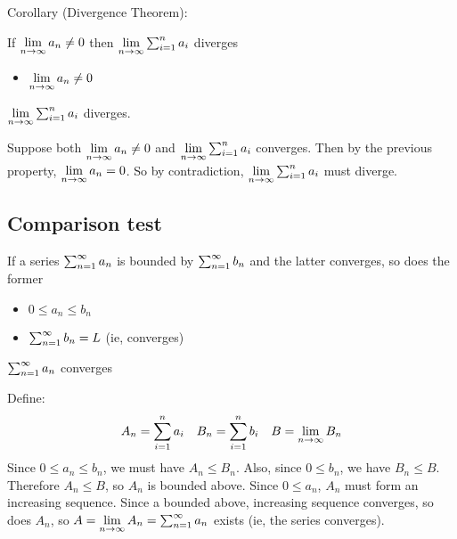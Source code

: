 Corollary (Divergence Theorem):

\begin{property}{If $\lim\limits_{n \rightarrow \infty} a_n \neq 0$ then $\lim\limits_{n \rightarrow \infty} \sum_{i=1}^{n} a_i$ diverges }
    \begin{precondition}
        \begin{itemize}
            \item $\lim\limits_{n \rightarrow \infty} a_n \neq 0$
        \end{itemize}
    \end{precondition}
    \begin{claim}
        $\lim\limits_{n \rightarrow \infty} \sum_{i=1}^{n} a_i$ diverges.
    \end{claim}
    \begin{Proof}
        Suppose both $\lim\limits_{n \rightarrow \infty} a_n \neq 0$ and $\lim\limits_{n \rightarrow \infty} \sum_{i=1}^{n} a_i$ converges. Then by the previous property, $\lim\limits_{n \rightarrow \infty} a_n = 0$. So by contradiction, $\lim\limits_{n \rightarrow \infty} \sum_{i=1}^{n} a_i$ must diverge.
    \end{Proof}
\end{property}



\subsection{Comparison test}

\begin{property}{If a series $\sum_{n=1}^{\infty} a_n$ is bounded by $\sum_{n=1}^{\infty} b_n$ and the latter converges, so does the former}
    \begin{precondition}
        \begin{itemize}
            \item $0 ≤ a_n ≤ b_n$
            \item $\sum_{n=1}^{\infty} b_n = L$ (ie, converges)
        \end{itemize}
    \end{precondition}
    \begin{claim}
        $\sum_{n=1}^{\infty} a_n$ converges
    \end{claim}
    \begin{Proof}
        Define:
        \begin{align*}
          A_n=\sum_{i=1}^{n} a_i && B_n=\sum_{i=1}^{n} b_i && B=\lim\limits_{n \rightarrow \infty} B_n
        \end{align*}
        Since $0 ≤ a_n ≤ b_n$, we must have $A_n ≤ B_n$. Also, since $0≤b_n$, we have $B_n≤B$.
        Therefore $A_n ≤B$, so $A_n$ is bounded above. Since $0≤a_n$, $A_n$ must form an increasing sequence.
        Since a bounded above, increasing sequence converges, so does $A_n$, so $A=\lim\limits_{n \rightarrow \infty} A_n=\sum_{n=1}^{\infty} a_n$ exists (ie, the series converges).


    \end{Proof}
\end{property}

